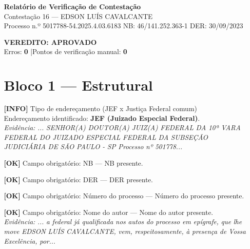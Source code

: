 \documentclass[12pt,a4paper]{article}
\newcommand{\statusOK}[1]{\textcolor{corOK}{\textbf{[OK]}} #1}
\newcommand{\statusINFO}[1]{\textcolor{corINFO}{\textbf{[INFO]}} #1}
\begin{document}
\begin{center}
  {\LARGE \textbf{Relatório de Verificação de Contestação}}\\[0.4em]
  {\large Contestação 16 --- EDSON LUÍS CAVALCANTE}\\[0.2em]
  {\small Processo n.º 5017788-54.2025.4.03.6183 \quad NB: 46/141.252.363-1 \quad DER: 30/09/2023}
\end{center}

\vspace{0.5em}

\noindent\colorbox{corFundoAprovado}{%
  \begin{minipage}{\dimexpr\linewidth-2\fboxsep}
    \centering
    \vspace{0.3em}
    {\large \textcolor{corOK}{\textbf{VEREDITO: APROVADO}}}\\
    Erros: \textbf{0} \quad|\quad Pontos de verificação manual: \textbf{0}
    \vspace{0.3em}
  \end{minipage}%
}

\vspace{1em}


\section{Bloco 1 --- Estrutural}

\statusINFO{Tipo de endereçamento (JEF x Justiça Federal comum)}\\
Endereçamento identificado: \textbf{JEF (Juizado Especial Federal)}.\\
\textit{Evidência: ... SENHOR(A) DOUTOR(A) JUIZ(A) FEDERAL DA 10ª VARA FEDERAL DO JUIZADO ESPECIAL FEDERAL DA SUBSEÇÃO JUDICIÁRIA DE SÃO PAULO - SP Processo nº 501778...}

\medskip
\statusOK{Campo obrigatório: NB} --- NB presente.

\medskip
\statusOK{Campo obrigatório: DER} --- DER presente.

\medskip
\statusOK{Campo obrigatório: Número do processo} --- Número do processo presente.

\medskip
\statusOK{Campo obrigatório: Nome do autor} --- Nome do autor presente.\\
\textit{Evidência: ... a federal já qualificada nos autos do processo em epígrafe, que lhe move EDSON LUÍS CAVALCANTE, vem, respeitosamente, à presença de Vossa Excelência, por...}
\end{document}
